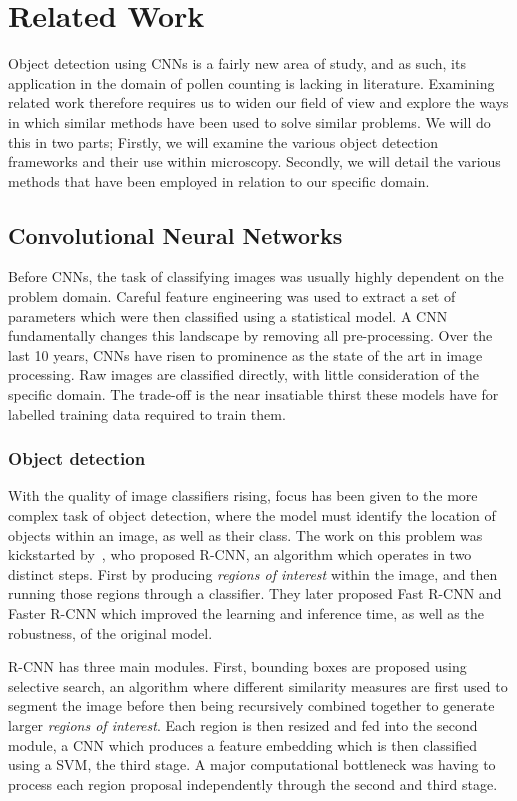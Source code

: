 \chapter{Related Work}\label{cha:related}
Object detection using CNNs is a fairly new area of study, and as such, its application in the domain of pollen counting is lacking in literature.
Examining related work therefore requires us to widen our field of view and explore the ways in which similar methods have been used to solve similar problems.
We will do this in two parts; Firstly, we will examine the various object detection frameworks and their use within microscopy.
Secondly, we will detail the various methods that have been employed in relation to our specific domain.

\section{Convolutional Neural Networks}\label{sec:rel-cnn}
Before CNNs, the task of classifying images was usually highly dependent on the problem domain.
Careful feature engineering was used to extract a set of parameters which were then classified using a statistical model.
A CNN fundamentally changes this landscape by removing all pre-processing.
Over the last 10 years, CNNs have risen to prominence as the state of the art in image processing.
Raw images are classified directly, with little consideration of the specific domain.
The trade-off is the near insatiable thirst these models have for labelled training data required to train them.

\subsection{Object detection}
With the quality of image classifiers rising, focus has been given to the more complex task of object detection, where the model must identify the location of objects within an image, as well as their class.
The work on this problem was kickstarted by~\cite{girshick_rich_2014}, who proposed R-CNN, an algorithm which operates in two distinct steps.
First by producing \textit{regions of interest} within the image, and then running those regions through a classifier.
They later proposed Fast R-CNN and Faster R-CNN which improved the learning and inference time, as well as the robustness, of the original model.

R-CNN has three main modules.
First, bounding boxes are proposed using selective search, an algorithm where different similarity measures are first used to segment the image before then being recursively combined together to generate larger \textit{regions of interest}.
Each region is then resized and fed into the second module, a CNN which produces a feature embedding which is then classified using a SVM, the third stage.
A major computational bottleneck was having to process each region proposal independently through the second and third stage.

